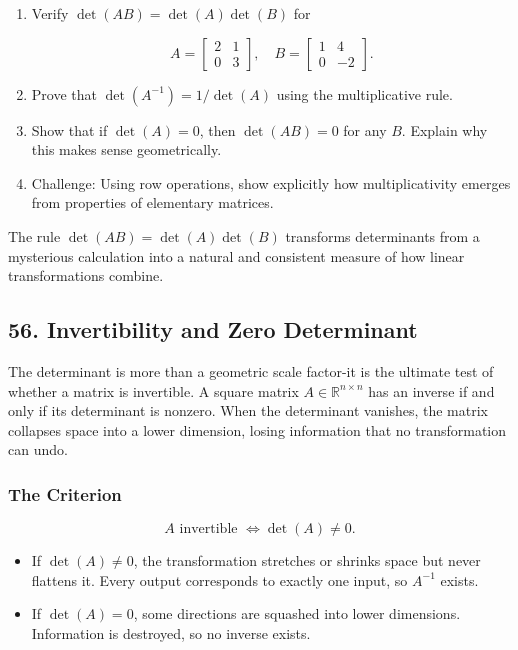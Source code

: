 \documentclass[
  letterpaper,
  DIV=11,
  numbers=noendperiod]{scrreprt}
\providecommand{\tightlist}{%
  \setlength{\itemsep}{0pt}\setlength{\parskip}{0pt}}
\begin{document}
\begin{enumerate}
\def\labelenumi{\arabic{enumi}.}
\item
  Verify \(\det(AB) = \det(A)\det(B)\) for

  \[
  A = \begin{bmatrix} 2 & 1 \\ 0 & 3 \end{bmatrix}, \quad 
  B = \begin{bmatrix} 1 & 4 \\ 0 & -2 \end{bmatrix}.
  \]
\item
  Prove that \(\det(A^{-1}) = 1/\det(A)\) using the multiplicative rule.
\item
  Show that if \(\det(A)=0\), then \(\det(AB)=0\) for any \(B\). Explain
  why this makes sense geometrically.
\item
  Challenge: Using row operations, show explicitly how multiplicativity
  emerges from properties of elementary matrices.
\end{enumerate}

The rule \(\det(AB) = \det(A)\det(B)\) transforms determinants from a
mysterious calculation into a natural and consistent measure of how
linear transformations combine.

\subsection{56. Invertibility and Zero
Determinant}\label{invertibility-and-zero-determinant}

The determinant is more than a geometric scale factor-it is the ultimate
test of whether a matrix is invertible. A square matrix
\(A \in \mathbb{R}^{n \times n}\) has an inverse if and only if its
determinant is nonzero. When the determinant vanishes, the matrix
collapses space into a lower dimension, losing information that no
transformation can undo.

\subsubsection{The Criterion}\label{the-criterion}

\[
A \text{ invertible } \iff \det(A) \neq 0.
\]

\begin{itemize}
\tightlist
\item
  If \(\det(A) \neq 0\), the transformation stretches or shrinks space
  but never flattens it. Every output corresponds to exactly one input,
  so \(A^{-1}\) exists.
\item
  If \(\det(A) = 0\), some directions are squashed into lower
  dimensions. Information is destroyed, so no inverse exists.
\end{itemize}
\end{document}
